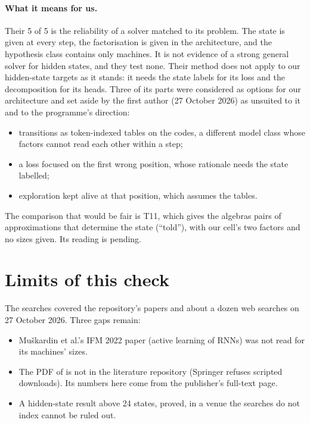 \documentclass[11pt]{article}
\begin{document}
\paragraph{What it means for us.} Their 5 of 5 is the reliability of a solver matched to its
problem. The state is given at every step, the factorisation is given in the architecture, and the
hypothesis class contains only machines. It is not evidence of a strong general solver for hidden
states, and they test none. Their method does not apply to our hidden-state targets as it stands:
it needs the state labels for its loss and the decomposition for its heads. Three of its parts were considered as options for our architecture and set aside by the first
author (27 October 2026) as unsuited to it and to the programme's direction:
\begin{itemize}
\item transitions as token-indexed tables on the codes, a different model class whose factors
  cannot read each other within a step;
\item a loss focused on the first wrong position, whose rationale needs the state labelled;
\item exploration kept alive at that position, which assumes the tables.
\end{itemize}
The comparison that would be fair is T11, which gives the algebras pairs of approximations that
determine the state (``told''), with our cell's two factors and no sizes given. Its reading is
pending.

\section{Limits of this check}

The searches covered the repository's papers and about a dozen web searches on 27 October 2026.
Three gaps remain:
\begin{itemize}
\item Muškardin et al.'s IFM 2022 paper (active learning of RNNs) was not read for its machines'
  sizes.
\item The PDF of \citeauthor{aichernig-2024-learning-minimal-automata-rnn} is not in the literature
  repository (Springer refuses scripted downloads). Its numbers here come from the publisher's
  full-text page.
\item A hidden-state result above 24 states, proved, in a venue the searches do not index cannot
  be ruled out.
\end{itemize}



\end{document}
